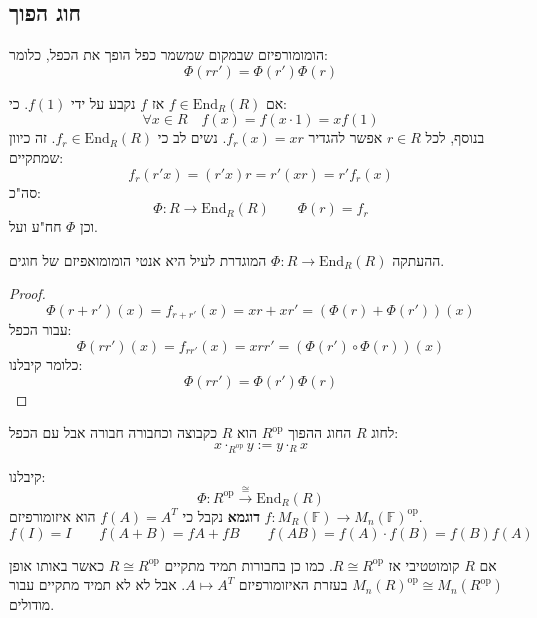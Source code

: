 \documentclass{tstextbook}
\begin{document}
\subsection{חוג הפוך}

\begin{definition}
הומומורפיזם שבמקום שמשמר כפל הופך את הכפל, כלומר:
$$\Phi(rr')=\Phi(r')\Phi(r)$$

\end{definition}
\begin{reminder}
אם \(f \in \mathrm{End}_{R}(R)\) אז \(f\) נקבע על ידי \(f(1)\). כי:
$$\forall x \in R\quad f(x)=f(x\cdot 1)=xf(1)$$
בנוסף, לכל \(r \in R\) אפשר להגדיר \(f_{r}(x)=xr\). נשים לב כי \(f_{r}\in \mathrm{End}_{R}(R)\). זה כיוון שמתקיים:
$$f_{r}(r'x)=(r'x)r=r'(xr)=r'f_{r}(x)$$
סה"כ:
$$\Phi:R\to \mathrm{End}_{R}(R)\qquad \Phi(r)=f_{r}$$
וכן \(\Phi\) חח"ע ועל.

\end{reminder}
\begin{proposition}
ההעתקה \(\Phi:R\to \mathrm{End}_{R}(R)\) המוגדרת לעיל היא אנטי הומומואפיזם של חוגים.

\end{proposition}
\begin{proof}
$$\Phi(r+r')(x)=f_{r+r'}(x)=xr+xr'=(\Phi(r)+\Phi(r'))(x)$$
עבור הכפל:
$$\Phi(rr')(x)=f_{rr'}(x)=xrr'=(\Phi(r')\circ  \Phi(r))(x)$$
כלומר קיבלנו:
$$\Phi(rr')=\Phi(r')\Phi(r)$$

\end{proof}
\begin{definition}
לחוג \(R\) החוג ההפוך \(R^{\text{op}}\) הוא \(R\) כקבוצה וכחבורה חבורה אבל עם הכפל:
$$x\cdot_{R^{\mathrm{op}}}y := y\cdot_{R} x$$

\end{definition}
\begin{corollary}
קיבלנו:
$$\Phi:R^{\text{op}}\xrightarrow{\cong }\mathrm{End}_{R}(R)$$\textbf{דוגמא}
נקבל כי \(f(A)=A^{T}\) הוא איזומורפיזם \(f:M_{R}(\mathbb{F})\to M_{n}(\mathbb{F})^{\mathrm{op}}\).
$$f(I)=I\qquad f(A+B)=fA+fB\qquad f(AB)=f(A)\cdot f(B)=f(B)f(A)$$

\end{corollary}
\begin{remark}
אם \(R\) קומוטטיבי אז \(R\cong R^{\text{op}}\). כמו כן בחבורות תמיד מתקיים \(R\cong R^{\text{op}}\) כאשר באותו אופן \(M_{n}(R)^{\text{op}}\cong M_{n}(R^{\text{op}})\) בעזרת האיזומורפיזם \(A\mapsto A^{T}\). אבל לא לא תמיד מתקיים עבור מודולים.

\end{remark}
\end{document}

